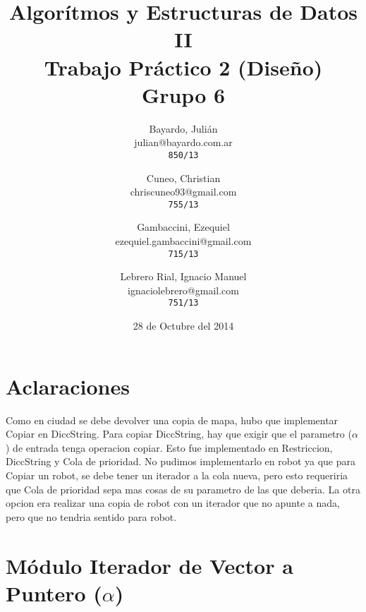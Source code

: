 \documentclass[a4paper,titlepage]{article}
\begin{document}
\title{Algorítmos y Estructuras de Datos II\\
Trabajo Práctico 2 (Diseño)\\
Grupo 6}

\author{
  Bayardo, Julián\\
  julian@bayardo.com.ar\\
  \texttt{850/13}
  \and
  Cuneo, Christian\\
  chriscuneo93@gmail.com\\
  \texttt{755/13}
  \and
  Gambaccini, Ezequiel\\
  ezequiel.gambaccini@gmail.com\\
  \texttt{715/13}
  \and
  Lebrero Rial, Ignacio Manuel\\
  ignaciolebrero@gmail.com\\
  \texttt{751/13}
}

\date{28 de Octubre del 2014}

\maketitle

\section{Aclaraciones}
Como en ciudad se debe devolver una copia de mapa, hubo que implementar Copiar
en DiccString. Para copiar DiccString, hay que exigir que el parametro ($\alpha$)
de entrada tenga operacion copiar. Esto fue implementado en Restriccion, DiccString
y Cola de prioridad. No pudimos implementarlo en robot ya que para Copiar un robot,
se debe tener un iterador a la cola nueva, pero esto requeriria que Cola de prioridad
sepa mas cosas de su parametro de las que deberia.
La otra opcion era realizar una copia de robot con un iterador que no apunte a nada,
pero que no tendria sentido para robot.
\section{Módulo Iterador de Vector a Puntero ($\alpha$)}
\end{document}
